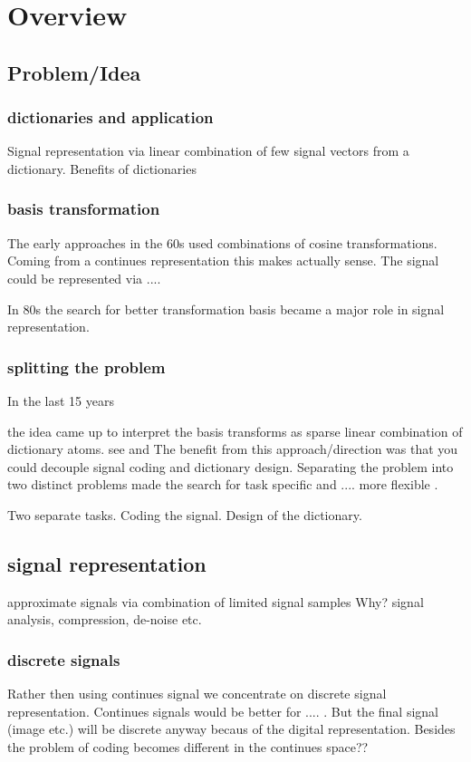 \chapter{Overview}

\section{Problem/Idea}
\subsection{dictionaries and application}
Signal representation via linear combination of few signal vectors from a dictionary.
Benefits of dictionaries

\subsection{basis transformation}
The early approaches in the 60s used combinations of cosine transformations. Coming from a continues representation this makes 
actually sense. The signal could be represented via ....

In 80s the search for better transformation basis became a major role in signal representation. \cite{}

\subsection{splitting the problem}
In the last 15 years 

the idea came up to interpret the basis transforms as sparse linear combination of dictionary atoms.
see \cite{Olshausen Field 1997} and \cite{}
The benefit from this approach/direction was that you could decouple signal coding and dictionary design.
Separating the problem into two distinct problems made the search for task specific and .... more flexible \cite{?}.

Two separate tasks.
Coding the signal. Design of the dictionary.


\section{signal representation}
approximate signals via combination of limited signal samples
Why?
signal analysis, compression, de-noise etc.

\subsection{discrete signals}
Rather then using continues signal we concentrate on discrete signal representation.
Continues signals would be better for .... . But the final signal (image etc.) will be discrete anyway becaus of the digital representation. Besides the problem of coding becomes different in the continues space??


